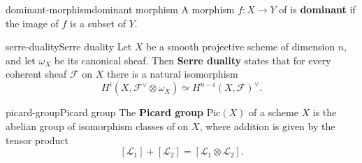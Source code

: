 
    

    


\begin{topic}{dominant-morphism}{dominant morphism}
    A morphism $f : X \to Y$ of  is \textbf{dominant} if the image of $f$ is a  subset of $Y$.
\end{topic}

\begin{topic}{serre-duality}{Serre duality}
    Let $X$ be a smooth projective scheme of dimension $n$, and let $\omega_X$ be its canonical sheaf. Then \textbf{Serre duality} states that for every coherent sheaf $\mathcal{F}$ on $X$ there is a natural isomorphism
    \[ H^i(X, \mathcal{F}^\vee \otimes \omega_X) \simeq H^{n - i}(X, \mathcal{F})^\vee . \]
\end{topic}

\begin{topic}{picard-group}{Picard group}
    The \textbf{Picard group} $\text{Pic}(X)$ of a scheme $X$ is the abelian group of isomorphism classes of  on $X$, where addition is given by the tensor product
    \[ [\mathcal{L}_1] + [\mathcal{L}_2] = [\mathcal{L}_1 \otimes \mathcal{L}_2] . \]
\end{topic}

